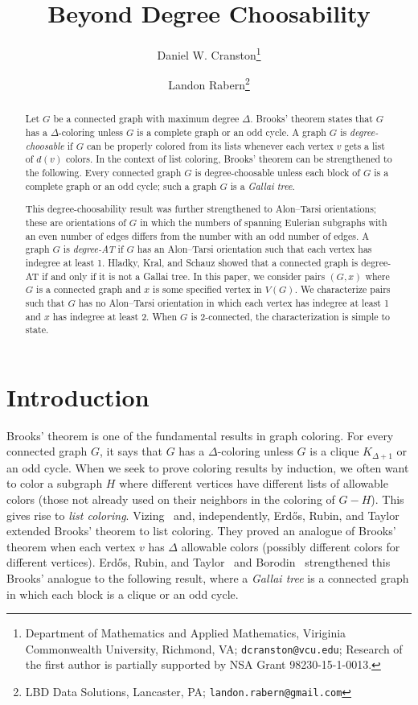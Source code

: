 \documentclass[12pt]{article}
\theoremstyle{plain}
\theoremstyle{definition}
\theoremstyle{remark}
\def\erdos{Erd\H{o}s}
\begin{document}
\title{Beyond Degree Choosability}
\author{Daniel W. Cranston\thanks{Department of Mathematics and Applied
Mathematics, Viriginia Commonwealth University, Richmond, VA;
\texttt{dcranston@vcu.edu}; 
Research of the first author is partially supported by NSA Grant
98230-15-1-0013.}
\and
Landon Rabern\thanks{LBD Data Solutions, Lancaster, PA;
\texttt{landon.rabern@gmail.com}}
}

\maketitle
\begin{abstract}
Let $G$ be a connected graph with maximum degree $\Delta$.  Brooks' theorem
states that $G$ has a $\Delta$-coloring unless $G$ is a complete graph or an
odd cycle.  A graph $G$ is \emph{degree-choosable} if $G$ can be properly
colored from its lists whenever each vertex $v$ gets a list of $d(v)$ colors.
In the context of list coloring, Brooks' theorem can be strengthened to the
following.  Every connected graph $G$ is degree-choosable unless each block of
$G$ is a complete graph or an odd cycle; such a graph $G$ is a \emph{Gallai
tree}.  

This degree-choosability result was further strengthened to Alon--Tarsi orientations;
these are orientations of $G$ in which the numbers of spanning Eulerian
subgraphs with an even number of edges differs from the number with an odd
number of edges.  A graph $G$ is \emph{degree-AT} if $G$ has an Alon--Tarsi
orientation such that each vertex has indegree at least 1.  Hladky, Kral, and
Schauz showed that a connected graph is degree-AT if and only if it is not a
Gallai tree.  In this paper, we consider pairs $(G,x)$ where $G$ is a connected
graph and $x$ is some specified vertex in $V(G)$.  We characterize pairs such
that $G$ has no Alon--Tarsi orientation in which each vertex has indegree at
least 1 and $x$ has indegree at least 2.  When $G$ is 2-connected, the
characterization is simple to state.
\end{abstract}

\section{Introduction}

Brooks' theorem is one of the fundamental results in graph coloring.
For every connected graph $G$, it says that $G$ has a $\Delta$-coloring
unless $G$ is a clique $K_{\Delta+1}$ or an odd cycle.  When we seek to prove coloring
results by induction, we often want to color a subgraph $H$ where different vertices
have different lists of allowable colors (those not already used on their
neighbors in the coloring of $G-H$).  This gives rise to \emph{list coloring}.
Vizing~\cite{vizing1976} and, independently, \erdos, Rubin, and
Taylor~\cite{ERT} extended Brooks'
theorem to list coloring. They proved an analogue of Brooks' theorem
when each vertex $v$ has $\Delta$ allowable colors (possibly
different colors for different vertices).  
\erdos, Rubin, and Taylor~\cite{ERT} and Borodin~\cite{borodin1977criterion} 
strengthened this Brooks' analogue to the following result, where a
\emph{Gallai tree} is a connected graph in which each block is a clique or an
odd cycle.  
\end{document}
